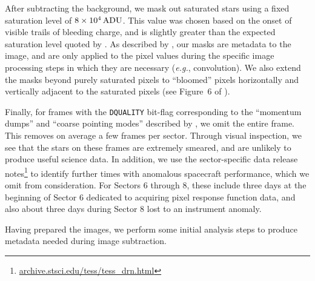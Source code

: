 \documentclass[12pt,twocolumn,tighten]{aastex62}
\begin{document}

After subtracting the background, we mask out saturated stars using a
fixed saturation level of $8\times10^4\,{\rm ADU}$. This value was
chosen based on the onset of visible trails of bleeding charge, and is
slightly greater than the expected saturation level quoted by
\citet{vanderspek_2018}.  As described by \citet{Pal_2009}, our masks
are metadata to the image, and are only applied to the
pixel values during the specific image processing steps in which they
are necessary ({\it e.g.}, convolution). We also extend the masks
beyond purely saturated pixels to ``bloomed'' pixels horizontally and
vertically adjacent to the saturated pixels (see Figure~6 of \citealt{Pal_2009}).

Finally, for frames with the \texttt{DQUALITY} bit-flag corresponding
to the ``momentum dumps'' and ``coarse pointing modes'' described by
\citet{vanderspek_2018}, we omit the entire frame.  This removes
on average a few frames per sector. Through visual inspection, we see
that the stars on these frames are extremely smeared, and are unlikely
to produce useful science data.
In addition, we use the sector-specific data release
notes\footnote{\url{ archive.stsci.edu/tess/tess_drn.html}} to
identify further times with anomalous spacecraft performance,
which we omit from consideration.
For Sectors 6 through 8, these include three days at the beginning of
Sector 6 dedicated to acquiring pixel response function data, and also
about three days during Sector 8 lost to an instrument anomaly.

Having prepared the images, we perform some initial analysis steps
to produce metadata
needed during image subtraction.  
\end{document}
